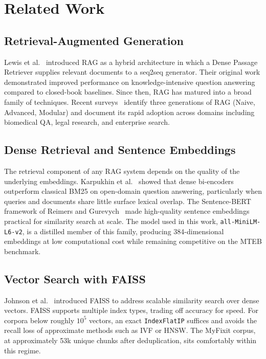 \documentclass[journal,onecolumn]{IEEEtran}
\begin{document}
\section{Related Work}
\label{sec:related}

\subsection{Retrieval-Augmented Generation}

Lewis et al.~\cite{lewis2020rag} introduced RAG as a hybrid architecture in
which a Dense Passage Retriever supplies relevant documents to a seq2seq
generator. Their original work demonstrated improved performance on
knowledge-intensive question answering compared to closed-book baselines.
Since then, RAG has matured into a broad family of techniques. Recent
surveys~\cite{gao2024ragsurvey, ranjan2024ragsurvey} identify three generations
of RAG (Naive, Advanced, Modular) and document its rapid adoption across
domains including biomedical QA, legal research, and enterprise search.

\subsection{Dense Retrieval and Sentence Embeddings}

The retrieval component of any RAG system depends on the quality of the
underlying embeddings. Karpukhin et al.~\cite{karpukhin2020dpr} showed that
dense bi-encoders outperform classical BM25 on open-domain question answering,
particularly when queries and documents share little surface lexical overlap.
The Sentence-BERT framework of Reimers and Gurevych~\cite{reimers2019sbert}
made high-quality sentence embeddings practical for similarity search at
scale. The model used in this work, \texttt{all-MiniLM-L6-v2}, is a distilled
member of this family, producing 384-dimensional embeddings at low
computational cost while remaining competitive on the MTEB
benchmark.

\subsection{Vector Search with FAISS}

Johnson et al.~\cite{johnson2019faiss} introduced FAISS to address scalable
similarity search over dense vectors. FAISS supports multiple index types,
trading off accuracy for speed. For corpora below roughly $10^5$ vectors, an
exact \texttt{IndexFlatIP} suffices and avoids the recall loss of approximate
methods such as IVF or HNSW. The MyFixit corpus, at approximately 53k unique
chunks after deduplication, sits comfortably within this regime.
\end{document}
